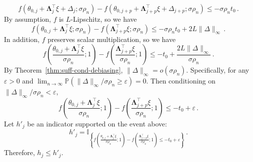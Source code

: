 \documentclass[11pt]{article}
\newcommand{\bLambda}{\boldsymbol{\Lambda}}
\newcommand{\Prob}{\mathbb{P}}
\begin{document}
\[
f(\theta_{0,j}+\bLambda_j^\top\xi+\Delta_j;\sigma\rho_n)-f(\theta_{0,j+p}+\bLambda_{j+p}^\top\xi+\Delta_{j+p};\sigma\rho_n)\leq -\sigma\rho_nt_0\,.
\]
By assumption, $f$ is $L$-Lipschitz, so we have 
\[
f(\theta_{0,j}+\bLambda_j^\top\xi;\sigma\rho_n)-f(\bLambda_{j+p}^\top\xi;\sigma\rho_n)\leq -\sigma\rho_nt_0+2L\|\Delta\|_\infty\,.
\]
In addition, $f$ preserves scalar multiplication, so we have
\[
f\left(\frac{\theta_{0,j}+\bLambda_j^\top\xi}{\sigma\rho_n};1\right)-f\left(\frac{\bLambda_{j+p}^\top\xi}{\sigma\rho_n};1\right)\leq -t_0+\frac{2L\|\Delta\|_\infty}{\sigma\rho_n}\,.
\]
By Theorem~\ref{thm:suff-cond-debiasing}, $\|\Delta\|_\infty=o(\sigma\rho_n)$. Specifically, for any $\varepsilon>0$ and $\lim_{n\to \infty}\Prob(\|\Delta\|_\infty/\sigma\rho_n\geq\varepsilon) =0$. Then conditioning on $\|\Delta\|_\infty/\sigma\rho_n<\varepsilon$,
\[
f\left(\frac{\theta_{0,j}+\bLambda_j^\top\xi}{\sigma\rho_n};1\right)-f\left(\frac{\bLambda_{j+p}^\top\xi}{\sigma\rho_n};1\right)\leq -t_0+\varepsilon\,.
\]
Let $h'_j$ be an indicator supported on the event above:
\begin{equation}\label{eq:h'}
    h'_j = \mathbb I_{\left\{f\left(\frac{\theta_{0,j}+\bLambda_j^\top\xi}{\sigma\rho_n};1\right)-f\left(\frac{\bLambda_{j+p}^\top\xi}{\sigma\rho_n};1\right)\leq -t_0+\varepsilon\right\}}\,.
\end{equation}
Therefore, $h_j\leq h'_j$.
\end{document}
